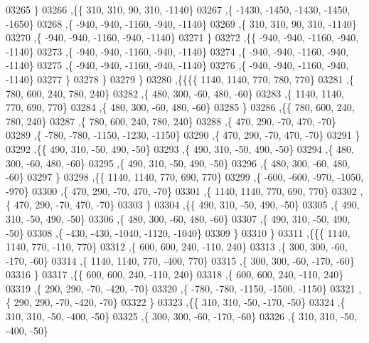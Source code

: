\begin{DoxyCode}
03265     \}
03266    ,\{\{   310,   310,    90,   310, -1140\}
03267     ,\{ -1430, -1450, -1430, -1450, -1650\}
03268     ,\{  -940,  -940, -1160,  -940, -1140\}
03269     ,\{   310,   310,    90,   310, -1140\}
03270     ,\{  -940,  -940, -1160,  -940, -1140\}
03271     \}
03272    ,\{\{  -940,  -940, -1160,  -940, -1140\}
03273     ,\{  -940,  -940, -1160,  -940, -1140\}
03274     ,\{  -940,  -940, -1160,  -940, -1140\}
03275     ,\{  -940,  -940, -1160,  -940, -1140\}
03276     ,\{  -940,  -940, -1160,  -940, -1140\}
03277     \}
03278    \}
03279   \}
03280  ,\{\{\{\{  1140,  1140,   770,   780,   770\}
03281     ,\{   780,   600,   240,   780,   240\}
03282     ,\{   480,   300,   -60,   480,   -60\}
03283     ,\{  1140,  1140,   770,   690,   770\}
03284     ,\{   480,   300,   -60,   480,   -60\}
03285     \}
03286    ,\{\{   780,   600,   240,   780,   240\}
03287     ,\{   780,   600,   240,   780,   240\}
03288     ,\{   470,   290,   -70,   470,   -70\}
03289     ,\{  -780,  -780, -1150, -1230, -1150\}
03290     ,\{   470,   290,   -70,   470,   -70\}
03291     \}
03292    ,\{\{   490,   310,   -50,   490,   -50\}
03293     ,\{   490,   310,   -50,   490,   -50\}
03294     ,\{   480,   300,   -60,   480,   -60\}
03295     ,\{   490,   310,   -50,   490,   -50\}
03296     ,\{   480,   300,   -60,   480,   -60\}
03297     \}
03298    ,\{\{  1140,  1140,   770,   690,   770\}
03299     ,\{  -600,  -600,  -970, -1050,  -970\}
03300     ,\{   470,   290,   -70,   470,   -70\}
03301     ,\{  1140,  1140,   770,   690,   770\}
03302     ,\{   470,   290,   -70,   470,   -70\}
03303     \}
03304    ,\{\{   490,   310,   -50,   490,   -50\}
03305     ,\{   490,   310,   -50,   490,   -50\}
03306     ,\{   480,   300,   -60,   480,   -60\}
03307     ,\{   490,   310,   -50,   490,   -50\}
03308     ,\{  -430,  -430, -1040, -1120, -1040\}
03309     \}
03310    \}
03311   ,\{\{\{  1140,  1140,   770,  -110,   770\}
03312     ,\{   600,   600,   240,  -110,   240\}
03313     ,\{   300,   300,   -60,  -170,   -60\}
03314     ,\{  1140,  1140,   770,  -400,   770\}
03315     ,\{   300,   300,   -60,  -170,   -60\}
03316     \}
03317    ,\{\{   600,   600,   240,  -110,   240\}
03318     ,\{   600,   600,   240,  -110,   240\}
03319     ,\{   290,   290,   -70,  -420,   -70\}
03320     ,\{  -780,  -780, -1150, -1500, -1150\}
03321     ,\{   290,   290,   -70,  -420,   -70\}
03322     \}
03323    ,\{\{   310,   310,   -50,  -170,   -50\}
03324     ,\{   310,   310,   -50,  -400,   -50\}
03325     ,\{   300,   300,   -60,  -170,   -60\}
03326     ,\{   310,   310,   -50,  -400,   -50\}

\end{DoxyCode}
